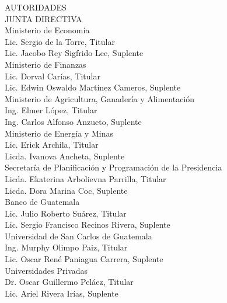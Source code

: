 \documentclass[12pt,letterpaper,twoside]{book}
\newcommand{\hoja}[1]{\noindent\begin{fondo} #1 \end{fondo}\clearpage}
\begin{document}
\hoja{
$\ $
\vspace{0.0cm}

\begin{center}
{\Bold \LARGE AUTORIDADES}\\[1cm]


{\Bold \large \color{color1!89!black} JUNTA  DIRECTIVA} \\[0.4cm]


{\Bold Ministerio de Economía}\\
Lic. Sergio de la Torre, Titular\\
Lic. Jacobo Rey Sigfrido Lee, Suplente\\[0.4cm]


{\Bold Ministerio de Finanzas}\\
Lic. Dorval Carías, Titular\\
Lic. Edwin Oswaldo Martínez Cameros, Suplente\\[0.4cm]


{\Bold Ministerio de Agricultura, Ganadería y Alimentación}\\
Ing. Elmer López, Titular\\
Ing. Carlos Alfonso Anzueto, Suplente\\[0.4cm]


{\Bold Ministerio de Energía y Minas}\\
Lic. Erick Archila, Titular\\
Licda. Ivanova Ancheta, Suplente\\[0.4cm]


{\Bold Secretaría de Planificación y Programación de la Presidencia}\\
Licda. Ekaterina Arbolievna Parrilla, Titular\\
Licda. Dora Marina Coc, Suplente\\[0.4cm]


{\Bold Banco de Guatemala}\\
Lic. Julio Roberto Suárez, Titular\\
Lic. Sergio Francisco Recinos Rivera, Suplente\\[0.4cm]



{\Bold Universidad de San Carlos de Guatemala}\\
Ing. Murphy Olimpo Paiz, Titular\\
Lic. Oscar René Paniagua Carrera, Suplente\\[0.4cm]


{\Bold Universidades Privadas}\\
Dr. Oscar Guillermo Peláez, Titular\\
Lic. Ariel Rivera Irías, Suplente\\[0.4cm]



\end{center}}
\end{document}
